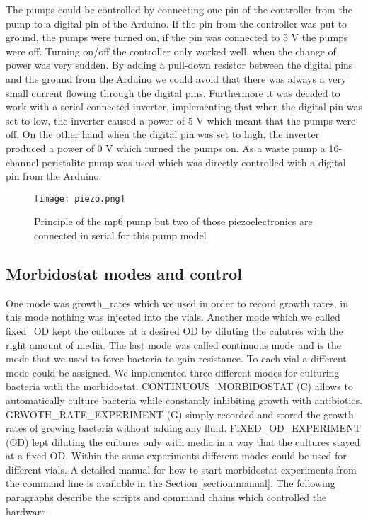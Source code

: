 The pumps could be controlled by connecting one pin of the controller from the pump to a digital pin of the Arduino. 
If the pin from the controller was put to ground, the pumps were turned on, if the pin was connected to 5 V the pumps were off. Turning on/off the controller only worked well, when the change of power was very sudden. 
By adding a pull-down resistor between the digital pins and the ground from the Arduino we could avoid that there was always a very small current flowing through the digital pins. Furthermore it was decided to work with a serial connected inverter, implementing that when the digital pin was set to low, the inverter caused a power of 5 V which meant that the pumps were off. On the other hand when the digital pin was set to high, the inverter produced a power of 0 V which turned the pumps on.  
As a waste pump a 16-channel peristalitc pump was used which was directly controlled with a digital pin from the Arduino. 
\label{section:pumps}
\begin{figure}
	\texttt{[image: piezo.png]}
	\caption{Principle of the mp6 pump but two of those piezoelectronics are connected in serial for this pump model \cite{piezo_pumps}}
	\label{figure:piezo}
\end{figure}

\subsection{Morbidostat modes and control}
One mode was growth\_rates which we used in order to record growth rates, in this mode nothing was injected into the vials. Another mode which we called fixed\_OD kept the cultures at a desired OD by diluting the culutres with the right amount of media. The last mode was called continuous mode and is the mode that we used to force bacteria to gain resistance. To each vial a different mode could be assigned. 
We implemented three different modes for culturing bacteria with the morbidostat. CONTINUOUS\_MORBIDOSTAT (C) allows to automatically culture bacteria while constantly inhibiting growth with antibiotics. GRWOTH\_RATE\_EXPERIMENT (G) simply recorded and stored the growth rates of growing bacteria without adding any fluid. FIXED\_OD\_EXPERIMENT (OD) lept diluting the cultures only with media in a way that the cultures stayed at a fixed OD.
Within the same experiments different modes could be used for different vials. A detailed manual for how to start morbidostat experiments from the command line is available in the Section \ref{section:manual}. The following paragraphs describe the scripts and command chains which controlled the hardware. \\

